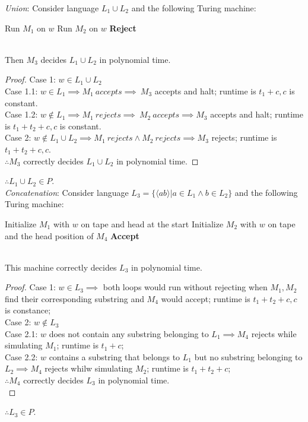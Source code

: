 \documentclass[letterpaper]{article}
\begin{document}
\textit{Union}: Consider language $L_1 \cup L_2$ and the following Turing machine:
\begin{algorithm}
    
    \caption{$M_3(w)$}
    \DontPrintSemicolon
    Run $M_1$ on $w$\;
    Run $M_2$ on $w$\;
    \textbf{Reject}\;
\end{algorithm}\\
Then $M_3$ decides $L_1 \cup L_2$ in polynomial time.
\begin{proof}
    Case 1: $w \in L_1 \cup L_2$\\
    Case 1.1: $w \in L_1 \implies M_1\ accepts \implies\ M_3$  accepts and halt; runtime is $t_1+c, c$ is constant.\\ 
    Case 1.2: $w \notin L_1 \implies M_1\ rejects \implies\ M_2\ accepts \implies M_3$  accepts and halt; runtime is $t_1+t_2+c, c$ is constant.\\ 
    Case 2: $w \notin L_1 \cup L_2 \implies M_1\ rejects \land M_2\ rejects \implies M_3$ rejects; runtime is $t_1+t_2+c, c$.\\
    $\therefore M_3$ correctly decides $L_1 \cup L_2$ in polynomial time.
\end{proof}
$\therefore L_1\cup L_2 \in P$.\\
\newpage
\textit{Concatenation}: Consider language $L_3=\{\langle ab \rangle | a \in L_1 \land b\in L_2\}$ and the following Turing machine:
\begin{algorithm}
    \caption{$M_4(w)$}
    \DontPrintSemicolon
    Initialize $M_1$ with $w$ on tape and head at the start\;
    Initialize $M_2$ with $w$ on tape and the head position of $M_4$\;
    \textbf{Accept}\;
\end{algorithm}\\
This machine correctly decides $L_3$ in polynomial time.
\begin{proof}
    Case 1: $w\in L_3 \implies$ both loops would run without rejecting when $M_1, M_2$ find their corresponding substring and $M_4$ would accept; runtime is $t_1+t_2+c, c$ is constance;\\
    Case 2: $w \notin L_3$\\
    Case 2.1: $w$ does not contain any substring belonging to $L_1 \implies M_4$ rejects while simulating $M_1$; runtime is $t_1+c$;\\
    Case 2.2: $w$ contains a substring that belongs to $L_1$ but no substring belonging to $L_2 \implies M_4$ rejects whilw simulating $M_2$; runtime is $t_1+t_2+c$;\\
    $\therefore M_4$ correctly decides $L_3$ in polynomial time.\\
\end{proof}
$\therefore L_3 \in P$.\\
\end{document}
